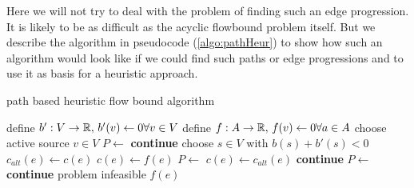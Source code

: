 Here we will not try to deal with the problem of finding such an edge progression. It is likely to be as 
difficult as the acyclic flowbound problem itself. But we describe the algorithm 
in pseudocode (\ref{algo:pathHeur}) to show how such an algorithm would look like if we 
could find such paths or edge progressions and to use it as basis for a heuristic approach.

% 
% 
% 

\begin{algorithm}
 \caption{path based heuristic flow bound algorithm}
\label{algo:pathHeur}
 \begin{algorithmic}[5]%
    \State define $b':V\to \mathbb{R},\, b'(v)\gets 0 \forall v\in V$ 
    \State define $f: A\to\mathbb{R},\, f(v)\gets 0 \forall a\in A$
      \State choose active source $v\in V$ 
	\State $P\gets $
	  \State {}\label{heur:lineAugCase1}
	  \State \textbf{continue}
	\EndIf
      \EndIf
	\State choose $s\in V$ with $b(s)+b'(s)<0$
	\State $c_{alt}(e)\gets c(e)$
	\State $c(e)\gets f(e)$
	\State $P\gets$
	\State $c(e)\gets c_{alt}(e)$
	  \State {}\label{heur:lineAugCase2}
	  \State \textbf{continue}
	\Else
	  \State $P\gets$ 
	    \State {}\label{heur:lineAugCase3}
	    \State \textbf{continue}
	  \Else
	    \State \Return problem infeasible
	  \EndIf
	\EndIf
    \EndWhile
    \State \Return $f(e)$
  \EndFunction
 \end{algorithmic}

\end{algorithm}


